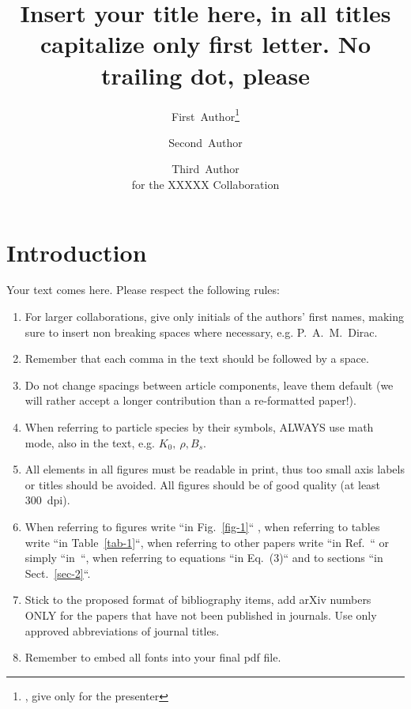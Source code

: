 \documentclass[epj]{webofc}
\begin{document}
%
\title{Insert your title here, in all titles capitalize only first letter. No trailing dot, please}

\author{First~Author\fnsep\thanks{, give only for the presenter} \and
        Second~Author \and
        Third~Author 
       \\for the XXXXX Collaboration
}


%
\maketitle
%
\section{Introduction}
\label{intro}
Your text comes here. Please respect the following rules:
\begin{enumerate}
\item For larger collaborations, give only initials of the authors' first names, making sure to insert non breaking spaces where necessary, e.g. P.~A.~M.~Dirac. 
\item Remember that each comma in the text should be followed by a space.
\item Do not change spacings between article components, leave them default (we will rather accept a longer contribution than a re-formatted paper!).
\item When referring to particle species by their symbols, ALWAYS use math mode, also in the text, e.g. $K_0,\ \rho, B_s$.
\item All elements in all figures must be readable in print, thus too small axis labels or titles should be avoided. All figures should be of good quality (at least 300~dpi).
\item When referring to figures write ``in Fig.~\ref{fig-1}`` , when referring to tables write ``in Table~\ref{tab-1}``, when referring to other papers write ``in Ref.~\cite{RefJ}`` or simply ``in~\cite{RefJ}``, when referring to equations ``in Eq.~(3)`` and to sections ``in Sect.~\ref{sec-2}``.
\item Stick to the proposed format of bibliography items, add arXiv numbers ONLY for the papers that have not been published in journals. Use only approved abbreviations of journal titles.
\item Remember to embed all fonts into your final pdf file.
\end{enumerate}
\end{document}
